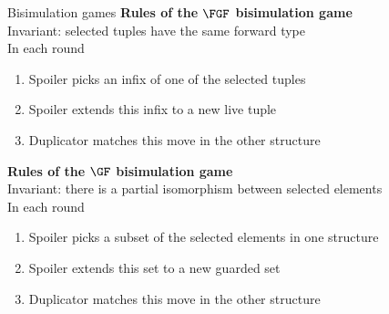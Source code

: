 \documentclass[aspectratio=169]{beamer}
\begin{document}
\begin{frame}{Bisimulation games}
  \textbf{Rules of the $\FGF$ bisimulation game}\\
  Invariant: selected tuples have the same forward type\\[2ex]
  In each round \begin{minipage}{0.8\textwidth}
  \begin{enumerate}
    \item Spoiler picks an infix of one of the selected tuples
    \item Spoiler extends this infix to a new live tuple
    \item Duplicator matches this move in the other structure
  \end{enumerate}
  \end{minipage}

  \vspace{3ex}
  \pause
  \textbf{Rules of the \alert{$\GF$} bisimulation game}\\
  Invariant: there is a \alert{partial isomorphism} between selected \alert{elements}\\[2ex]
  In each round \begin{minipage}{0.82\textwidth}
  \begin{enumerate}
    \item Spoiler picks \alert{a subset} of the selected elements in one structure
    \item Spoiler extends this set to a new \alert{guarded set}
    \item Duplicator matches this move in the other structure
  \end{enumerate}
  \end{minipage}
\end{frame}
\end{document}
